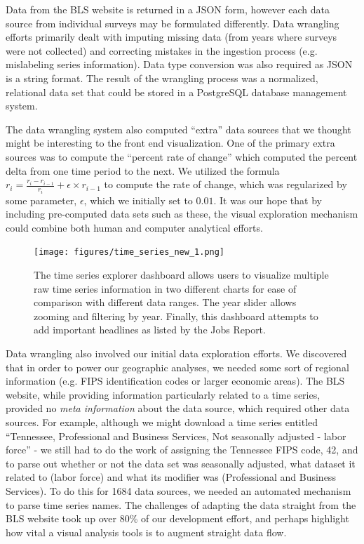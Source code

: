 \documentclass{sigchi}
\begin{document}
{Data from the BLS website is returned in a JSON form, however each data source from individual surveys may be formulated differently. Data wrangling efforts primarily dealt with imputing missing data (from years where surveys were not collected) and correcting mistakes in the ingestion process (e.g. mislabeling series information). Data type conversion was also required as JSON is a string format. The result of the wrangling process was a normalized, relational data set that could be stored in a PostgreSQL database management system.

The data wrangling system also computed ``extra'' data sources that we thought might be interesting to the front end visualization. One of the primary extra sources was to compute the ``percent rate of change'' which computed the percent delta from one time period to the next. We utilized the formula $r_i = \frac{r_i - r_{i-1}}{r_i} + \epsilon \times r_{i-1}$ to compute the rate of change, which was regularized by some parameter, $\epsilon$, which we initially set to $0.01$.  It was our hope that by including pre-computed data sets such as these, the visual exploration mechanism could combine both human and computer analytical efforts.

\begin{figure}[!ht]
    \centering
    \texttt{[image: figures/time\_series\_new\_1.png]}
    \caption{The time series explorer dashboard allows users to visualize multiple raw time series information in two different charts for ease of comparison with different data ranges. The year slider allows zooming and filtering by year. Finally, this dashboard attempts to add important headlines as listed by the Jobs Report.}
    \label{fig:time_series}
\end{figure}


Data wrangling also involved our initial data exploration efforts. We discovered that in order to power our geographic analyses, we needed some sort of regional information (e.g. FIPS identification codes or larger economic areas). The BLS website, while providing information particularly related to a time series, provided no \textit{meta information} about the data source, which required other data sources. For example, although we might download a time series entitled ``Tennessee, Professional and Business Services, Not seasonally adjusted - labor force'' - we still had to do the work of assigning the Tennessee FIPS code, 42, and to parse out whether or not the data set was seasonally adjusted, what dataset it related to (labor force) and what its modifier was (Professional and Business Services). To do this for 1684 data sources, we needed an automated mechanism to parse time series names. The challenges of adapting the data straight from the BLS website took up over 80\% of our development effort, and perhaps highlight how vital a visual analysis tools is to augment straight data flow.}
\end{document}

